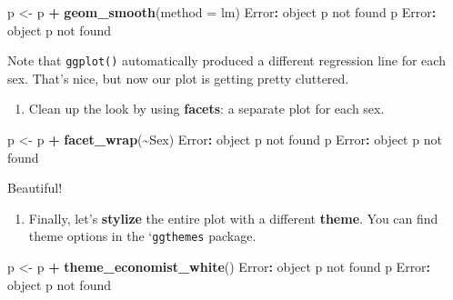 \documentclass[
]{book}
\newenvironment{Shaded}{\begin{snugshade}}{\end{snugshade}}
\newcommand{\AttributeTok}[1]{\textcolor[rgb]{0.13,0.29,0.53}{#1}}
\newcommand{\FunctionTok}[1]{\textcolor[rgb]{0.13,0.29,0.53}{\textbf{#1}}}
\newcommand{\NormalTok}[1]{#1}
\newcommand{\OtherTok}[1]{\textcolor[rgb]{0.56,0.35,0.01}{#1}}
\newcommand{\SpecialCharTok}[1]{\textcolor[rgb]{0.81,0.36,0.00}{\textbf{#1}}}
\newcommand{\StringTok}[1]{\textcolor[rgb]{0.31,0.60,0.02}{#1}}
\providecommand{\tightlist}{%
  \setlength{\itemsep}{0pt}\setlength{\parskip}{0pt}}
\begin{document}
\begin{Shaded}
\begin{Highlighting}[]
\NormalTok{p }\OtherTok{\textless{}{-}}\NormalTok{ p }\SpecialCharTok{+} \FunctionTok{geom\_smooth}\NormalTok{(}\AttributeTok{method =} \StringTok{\textquotesingle{}lm\textquotesingle{}}\NormalTok{)}
\NormalTok{Error}\SpecialCharTok{:}\NormalTok{ object }\StringTok{\textquotesingle{}p\textquotesingle{}}\NormalTok{ not found}
\NormalTok{p}
\NormalTok{Error}\SpecialCharTok{:}\NormalTok{ object }\StringTok{\textquotesingle{}p\textquotesingle{}}\NormalTok{ not found}
\end{Highlighting}
\end{Shaded}

Note that \texttt{ggplot()} automatically produced a different regression line for each sex. That's nice, but now our plot is getting pretty cluttered.

\begin{enumerate}
\def\labelenumi{(\arabic{enumi})}
\setcounter{enumi}{6}
\tightlist
\item
  Clean up the look by using \textbf{facets}: a separate plot for each sex.
\end{enumerate}

\begin{Shaded}
\begin{Highlighting}[]
\NormalTok{p }\OtherTok{\textless{}{-}}\NormalTok{ p }\SpecialCharTok{+} \FunctionTok{facet\_wrap}\NormalTok{(}\SpecialCharTok{\textasciitilde{}}\NormalTok{Sex)}
\NormalTok{Error}\SpecialCharTok{:}\NormalTok{ object }\StringTok{\textquotesingle{}p\textquotesingle{}}\NormalTok{ not found}
\NormalTok{p}
\NormalTok{Error}\SpecialCharTok{:}\NormalTok{ object }\StringTok{\textquotesingle{}p\textquotesingle{}}\NormalTok{ not found}
\end{Highlighting}
\end{Shaded}

Beautiful!

\begin{enumerate}
\def\labelenumi{(\arabic{enumi})}
\setcounter{enumi}{7}
\tightlist
\item
  Finally, let's \textbf{stylize} the entire plot with a different \textbf{theme}. You can find theme options in the `\texttt{ggthemes} package.
\end{enumerate}

\begin{Shaded}
\begin{Highlighting}[]
\NormalTok{p }\OtherTok{\textless{}{-}}\NormalTok{ p }\SpecialCharTok{+} \FunctionTok{theme\_economist\_white}\NormalTok{()}
\NormalTok{Error}\SpecialCharTok{:}\NormalTok{ object }\StringTok{\textquotesingle{}p\textquotesingle{}}\NormalTok{ not found}
\NormalTok{p}
\NormalTok{Error}\SpecialCharTok{:}\NormalTok{ object }\StringTok{\textquotesingle{}p\textquotesingle{}}\NormalTok{ not found}
\end{Highlighting}
\end{Shaded}
\end{document}
